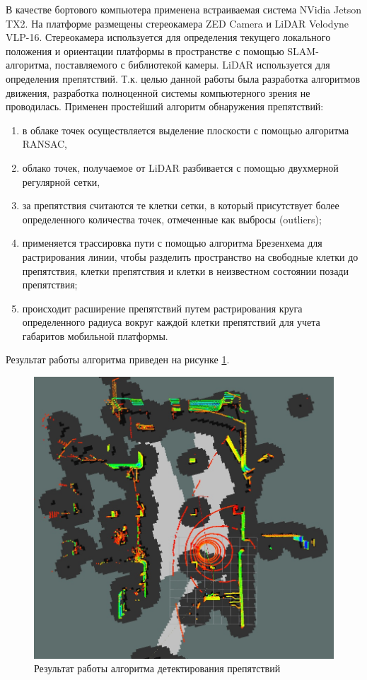 В качестве бортового компьютера применена встраиваемая система NVidia Jetson TX2. На платформе размещены
стереокамера ZED Camera и LiDAR Velodyne VLP-16. Стереокамера используется для определения текущего локального
положения и ориентации платформы в пространстве с помощью SLAM-алгоритма, поставляемого с библиотекой
камеры. LiDAR используется для определения препятствий. Т.к. целью данной работы была разработка алгоритмов
движения, разработка полноценной системы компьютерного зрения не проводилась. Применен простейший алгоритм
обнаружения препятствий:
\begin{enumerate}
    \item в облаке точек осуществляется выделение плоскости с помощью алгоритма RANSAC,
    \item облако точек, получаемое от LiDAR разбивается с помощью двухмерной регулярной сетки,
    \item за препятствия считаются те клетки сетки, в который присутствует более определенного
          количества точек, отмеченные как выбросы (outliers);
    \item применяется трассировка пути с помощью алгоритма Брезенхема для растрирования линии, чтобы
          разделить пространство на свободные клетки до препятствия, клетки препятствия и клетки в неизвестном
          состоянии позади препятствия;
    \item происходит расширение препятствий путем растрирования круга определенного радиуса вокруг каждой
          клетки препятствий для учета габаритов мобильной платформы.
\end{enumerate}

Результат работы алгоритма приведен на рисунке \ref{img:obstacles_lidar}.

\begin{figure}[h]
    \centering
    \includegraphics[width=\linewidth]{images/3_devel/obstacles_lidar}
    \caption{Результат работы алгоритма детектирования препятствий}
    \label{img:obstacles_lidar}
\end{figure}

